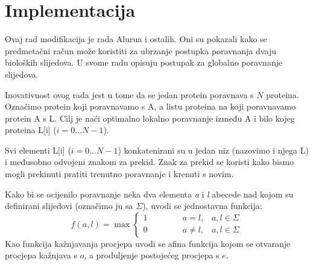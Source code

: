 \documentclass[times, utf8, zavrsni, numeric]{fer}
\begin{document}
\chapter{Implementacija}
\indent

Ovaj rad modifikacija je rada Alurua i ostalih\cite{aluru}. Oni su pokazali kako se predmetačni račun može koristiti za ubrzanje postupka poravnanja dvaju bioloških slijedova. U svome radu opisuju postupak za globalno poravnanje slijedova.

Inovativnost ovog rada jest u tome da se jedan protein poravnava s $N$ proteina. Označimo protein koji poravnavamo s A, a listu proteina na koji poravnavamo protein A s L. Cilj je naći optimalno lokalno poravnanje između A i bilo kojeg proteina L[i] ($i = 0...N-1$).

Svi elementi L[i] ($i = 0...N-1$) konkatenirani su u jedan niz (nazovimo i njega L) i međusobno odvojeni znakom za prekid. Znak za prekid se koristi kako bismo mogli prekinuti pratiti trenutno poravnanje i krenuti s novim.

Kako bi se ocijenilo poravnanje neka dva elementa \emph{a} i \emph{l} abecede nad kojom su definirani slijedovi (označimo ju sa $\Sigma$), uvodi se jednostavna funkcija:
\begin{equation}
f(a, l) = \max \left\{
	\begin{array}{lr}
		1\hspace{50pt}a = l,\hspace{10pt}a,l \in \Sigma \\
		0\hspace{50pt}a \ne l,\hspace{10pt}a, l \in \Sigma
	\end{array}
\right.
\end{equation}
Kao funkcija kažnjavanja procjepa uvodi se afina funkcija kojom se otvaranje procjepa kažnjava s $o$, a produljenje postojećeg procjepa s $e$.
\end{document}
